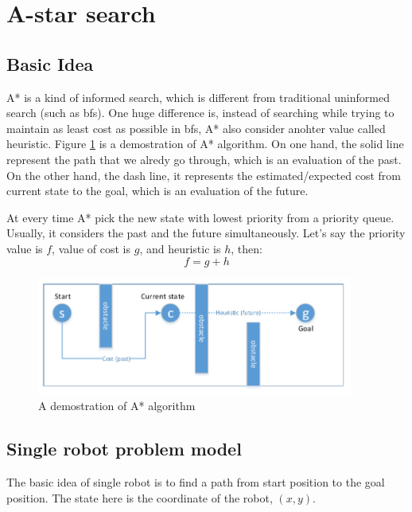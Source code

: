 \clearpage
\section{A-star search}
\subsection{Basic Idea}

A* is a kind of informed search, which is different from traditional uninformed search (such as bfs). One huge difference is, instead of searching while trying to maintain as least cost as possible in bfs, A* also consider anohter value called heuristic. Figure \ref{astar} is a demostration of A* algorithm. On one hand, the solid line represent the path that we alredy go through, which is an evaluation of the past. On the other hand, the dash line, it represents the estimated/expected cost from current state to the goal, which is an evaluation of the future.

At every time A* pick the new state with lowest priority from a priority queue. Usually, it considers the past and the future simultaneously. Let's say the priority value is $f$, value of cost is $g$, and heuristic is $h$, then:
$$f = g + h$$

\begin{figure}[!h]
\centering
\includegraphics[width=0.927\textwidth]{astar.pdf}
\caption{A demostration of A* algorithm}
\label{astar}
\end{figure}



\subsection{Single robot problem model}
The basic idea of single robot is to find a path from start position to the goal position. The state here is the coordinate of the robot, $(x,y)$.




